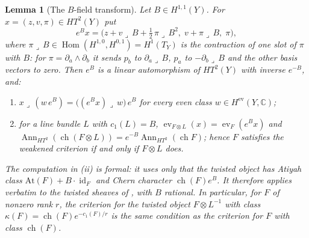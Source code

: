 \documentclass[11pt,reqno]{amsart}
\theoremstyle{plain}
\newtheorem{lemma}[theorem]{Lemma}
\theoremstyle{definition}
\theoremstyle{remark}
\newcommand{\CC}{\mathbb{C}}
\DeclareMathOperator{\ch}{ch}
\DeclareMathOperator{\Hom}{Hom}
\DeclareMathOperator{\id}{id}
\DeclareMathOperator{\Ann}{Ann}
\begin{document}
\begin{lemma}[The $B$-field transform]\label{lem:bfield}
Let $B\in H^{1,1}(Y)$. For $x=(z,v,\pi)\in HT^{2}(Y)$ put
\begin{equation}\label{eq:bfield}
  e^{B}x=\bigl(z+v\lrcorner\,B+\tfrac12\,\pi\lrcorner\,B^{2},\;
  v+\pi\lrcorner\,B,\;\pi\bigr),
\end{equation}
where $\pi\lrcorner\,B\in\Hom(H^{1,0},H^{0,1})=H^{1}(T_{Y})$ is the contraction
of one slot of $\pi$ with $B$: for $\pi=\partial_{a}\wedge\partial_{b}$ it sends
$p_{b}$ to $\partial_{a}\lrcorner\,B$, $p_{a}$ to $-\partial_{b}\lrcorner\,B$
and the other basis vectors to zero. Then $e^{B}$ is a linear automorphism of
$HT^{2}(Y)$ with inverse $e^{-B}$, and:
\begin{enumerate}[label=\textup{(\roman*)},nosep]
\item $x\lrcorner\,(w\,e^{B})=\bigl((e^{B}x)\lrcorner\,w\bigr)\,e^{B}$ for
  every even class $w\in H^{\mathrm{ev}}(Y,\CC)$;
\item for a line bundle $L$ with $c_{1}(L)=B$,
  $\operatorname{ev}_{F\otimes L}(x)=\operatorname{ev}_{F}(e^{B}x)$ and
  $\Ann_{HT^{2}}(\ch(F\otimes L))=e^{-B}\Ann_{HT^{2}}(\ch F)$; hence $F$
  satisfies the weakened criterion if and only if $F\otimes L$ does.
\end{enumerate}
The computation in (ii) is formal: it uses only that the twisted object has
Atiyah class $\mathrm{At}(F)+B\cdot\id_{F}$ and Chern character
$\ch(F)e^{B}$. It therefore applies verbatim to the twisted sheaves of
\cite[Section 2]{Mar25b}, with $B$ rational. In particular, for $F$ of
nonzero rank $r$, the criterion for the twisted object $F\otimes L^{-1}$ with class
$\kappa(F)=\ch(F)e^{-c_{1}(F)/r}$ is the same condition as the criterion for
$F$ with class $\ch(F)$.
\end{lemma}
\end{document}
